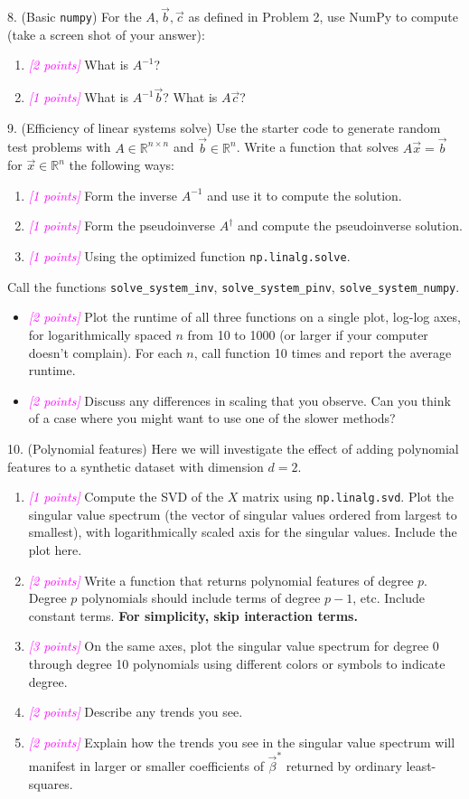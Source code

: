 \documentclass{article}
\newcommand{\R}{\mathbb{R}} %
\newcommand{\points}[1]{\small\textcolor{magenta}{\emph{[#1 points]}} \normalsize}
\begin{document}
\vspace{1em}
8. (Basic {\tt numpy}) For the $A, \vec b, \vec c$ as defined in Problem 2, use
NumPy to compute (take a screen shot of your answer):
\begin{enumerate}
\item \points{2} What is $A^{-1}$?
\item \points{1} What is $A^{-1} \vec b$? What is $A \vec c$?
\end{enumerate}

9. (Efficiency of linear systems solve)
Use the starter code to generate random test problems
with $A \in \R^{n \times n}$ and $\vec b \in \R^{n}$.
Write a function that solves $A \vec x = \vec b$ for $\vec x \in \R^n$
the following ways:
\begin{enumerate}
\item \points{1} Form the inverse $A^{-1}$ and use it to compute the solution.
\item \points{1} Form the pseudoinverse $A^\dagger$ and compute the pseudoinverse solution.
\item \points{1} Using the optimized function {\tt np.linalg.solve}.
\end{enumerate}
Call the functions {\tt solve\_system\_inv}, {\tt solve\_system\_pinv}, {\tt solve\_system\_numpy}.
\begin{itemize}
\item \points{2} Plot the runtime of all three functions
  on a single plot, log-log axes, for logarithmically spaced
  $n$ from 10 to 1000 (or larger if your computer doesn't complain). 
  For each $n$, call function 10 times and report the average runtime.
\item \points{2} Discuss any differences in scaling that you observe.
Can you think of a case where you might want to use one of the slower methods?
\end{itemize}

10. (Polynomial features)
Here we will investigate the effect of adding polynomial features to a synthetic dataset 
with dimension $d=2$.
\begin{enumerate}
\item \points{1} Compute the SVD of the $X$ matrix using {\tt np.linalg.svd}. 
  Plot the singular value spectrum (the vector of singular values ordered from largest to smallest),
  with logarithmically scaled axis for the singular values. Include the plot here.
\item \points{2} Write a function that returns polynomial features of degree $p$.
  Degree $p$ polynomials should include terms of degree $p-1$, etc.
  Include constant terms.
  {\bf For simplicity, skip interaction terms.}
\item \points{3} On the same axes, plot the singular value spectrum for degree 0 through degree 10 polynomials
  using different colors or symbols to indicate degree.
\item \points{2} Describe any trends you see. 
\item \points{2} Explain how the trends you see in the singular value spectrum will manifest
  in larger or smaller coefficients of $\vec \beta^*$ returned by ordinary least-squares.
\end{enumerate}
\end{document}
